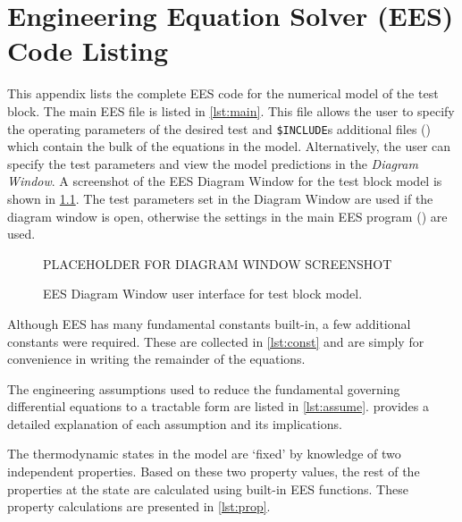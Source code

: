\chapter{Engineering Equation Solver (EES) Code Listing} \label{app:code}

This appendix lists the complete EES code for the numerical model of the test block.
The main EES file is listed in \cref{lst:main}. This file allows the user to specify
the operating parameters of the desired test and \verb+$INCLUDE+s additional files
() which contain 
the bulk of the equations in the model. 
Alternatively, the user can specify the test parameters and view the model 
predictions in the \emph{Diagram Window}. A screenshot of the EES Diagram Window 
for the test block model is shown in \cref{fig:DiagWindow}. The test parameters
set in the Diagram Window are used if the diagram window is open, otherwise the
settings in the main EES program () are used.
\begin{figure}[htbp]
	\centering
	PLACEHOLDER FOR DIAGRAM WINDOW SCREENSHOT
	\caption{EES Diagram Window user interface for test block model.}
	\label{fig:DiagWindow}
\end{figure}

Although EES has many fundamental constants built-in, a few additional constants
were required. These are collected in \cref{lst:const} and are simply for convenience
in writing the remainder of the equations.
%

The engineering assumptions used to reduce the fundamental governing differential
equations to a tractable form are listed in \cref{lst:assume}. 
provides a detailed explanation of each assumption and its implications.
%

The thermodynamic states in the model are `fixed' by knowledge of two independent
properties. Based on these two property values, the rest of the properties at the
state are calculated using built-in EES functions. These property calculations are
presented in \cref{lst:prop}. 
%

